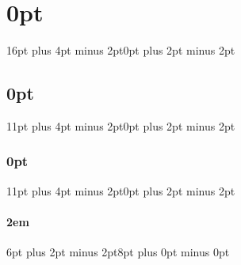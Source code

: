 \titlespacing\section{0pt}{16pt plus 4pt minus 2pt}{0pt plus 2pt minus 2pt}
\titlespacing\subsection{0pt}{11pt plus 4pt minus 2pt}{0pt plus 2pt minus 2pt}
\titlespacing\subsubsection{0pt}{11pt plus 4pt minus 2pt}{0pt plus 2pt minus 2pt}
\titlespacing\paragraph{2em}{6pt plus 2pt minus 2pt}{8pt plus 0pt minus 0pt}



\usepackage{pbox}
\usepackage{array}%



\usepackage{multicol}


\usepackage[bottom]{footmisc}
\newcommand{\astfootnote}[1]{
	\let\oldthefootnote=\thefootnote
	\setcounter{footnote}{0}
	\renewcommand{\thefootnote}{\fnsymbol{footnote}}
	\hspace*{-.45cm}\footnote{#1}\unskip
	\let\thefootnote=\oldthefootnote
}

